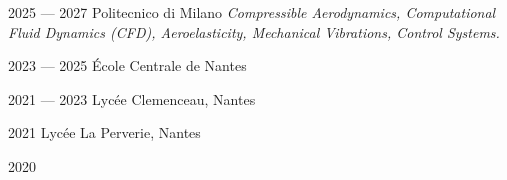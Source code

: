 

        {2025 — 2027}
        {Politecnico di Milano}%
        {%
           \small \textit{Compressible Aerodynamics, Computational Fluid Dynamics (CFD), Aeroelasticity, Mechanical Vibrations, Control Systems.}
        }

        {2023 — 2025}
        {École Centrale de Nantes}
        {
        }

        {2021 — 2023}
        {Lycée Clemenceau, Nantes}
        {}

        {2021}
        {Lycée La Perverie, Nantes}
        {%
        }

        {2020}
        {}
        {}
